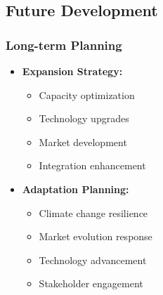 \subsection{Future Development}

\subsubsection{Long-term Planning}
\begin{itemize}
    \item \textbf{Expansion Strategy:}
    \begin{itemize}
        \item Capacity optimization
        \item Technology upgrades
        \item Market development
        \item Integration enhancement
    \end{itemize}
    
    \item \textbf{Adaptation Planning:}
    \begin{itemize}
        \item Climate change resilience
        \item Market evolution response
        \item Technology advancement
        \item Stakeholder engagement
    \end{itemize}
\end{itemize}
